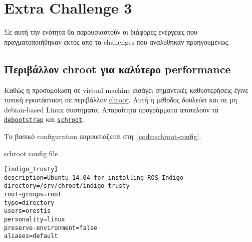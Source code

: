 \section{Extra Challenge 3}
Σε αυτή την ενότητα θα παρουσιαστούν οι διάφορες ενέργειες που πραγματοποιήθηκαν εκτός από τα challenges που αναλύθηκαν προηγουμένως.

\subsection{Περιβάλλον chroot για καλύτερο performance}\label{seq:chroot}
Καθώς η προσομοίωση σε virtual machine εισάγει σημαντικές καθυστερήσεις έγινε τοπική εγκατάσταση σε περιβάλλον \href{https://en.wikipedia.org/wiki/Chroot}{chroot}.
Αυτή η μέθοδος δουλεύει και σε μη debian-based Linux συστήματα.
Απαραίτητα προγράμματα αποτελούν τα \href{https://linux.die.net/man/8/debootstrap}{\texttt{debootstrap}}
και \href{https://linux.die.net/man/1/schroot}{\texttt{schroot}}.

Το βασικό configuration παρουσιάζεται στη~\ref{code:schroot-config}.
\begin{code}
\caption{schroot config file}\label{code:schroot-config}
\begin{verbatim}
[indigo_trusty]
description=Ubuntu 14.04 for installing ROS Indigo
directory=/srv/chroot/indigo_trusty
root-groups=root
type=directory
users=orestis
personality=linux
preserve-environment=false
aliases=default
\end{verbatim}
\end{code}

